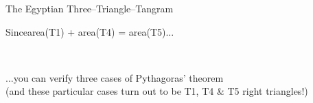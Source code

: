 \documentclass[14pt]{beamer}
\begin{document}
    \begin{frame}{The Egyptian Three--Triangle--Tangram}
        \begin{center}
            Since\quad area(T1) + area(T4) = area(T5)\quad...

            \bigskip \bigskip

            \!\!\!\!
            \qquad
             \\

            \bigskip \bigskip

            ...you can verify three cases of Pythagoras' theorem\\
            {\footnotesize (and these particular cases turn out to be T1, T4 \& T5 right triangles!)}
        \end{center}
    \end{frame}
\end{document}
